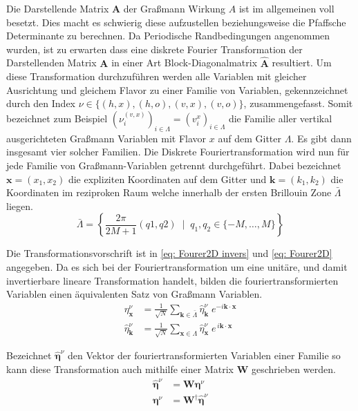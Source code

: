 \noindent Die Darstellende Matrix $\bm A$ der Graßmann Wirkung $A$ ist im allgemeinen voll besetzt. Dies macht es schwierig diese aufzustellen beziehungsweise die Pfaffsche Determinante zu berechnen. Da Periodische Randbedingungen angenommen wurden, ist zu erwarten dass eine diskrete Fourier Transformation der Darstellenden Matrix $\bm A$ in einer Art Block-Diagonalmatrix $\bm{\hat{A}}$ resultiert. Um diese Transformation durchzuführen werden alle Variablen mit gleicher Ausrichtung und gleichem Flavor zu einer Familie von Variablen, gekennzeichnet durch den Index $\nu \in \{(h,x), (h,o), (v,x), (v,o)\}$, zusammengefasst. Somit bezeichnet zum Beispiel $(\nu_i^{(v,x)})_{i \in \Lambda} = (v^x_i)_{i \in \Lambda}$ die Familie aller vertikal ausgerichteten Graßmann Variablen mit Flavor $x$ auf dem Gitter $\Lambda$. Es gibt dann insgesamt vier solcher Familien. Die Diskrete Fouriertransformation wird nun für jede Familie von Graßmann-Variablen getrennt durchgeführt. Dabei bezeichnet $\bm{x} = (x_1, x_2)$ die expliziten Koordinaten auf dem Gitter und $\bm{k} = (k_1,k_2)$ die Koordinaten im reziproken Raum welche innerhalb der ersten Brillouin Zone $\bar{\Lambda}$ liegen. 
\begin{equation}
\bar{\Lambda} = \left\{ \frac{2\pi}{2M+1}(q1, q2) \;\; |\;\; q_1,q_2 \in \{-M,\dots,M\} \right\} 
\end{equation}

\noindent Die Transformationsvorschrift ist in \eqref{eq: Fourer2D invers} und \eqref{eq: Fourer2D} angegeben. Da es sich bei der Fouriertransformation um eine unitäre, und damit invertierbare lineare Transformation handelt, bilden die fouriertransformierten Variablen einen äquivalenten Satz von Graßmann Variablen. 
\begin{align}
\eta_{\bm{x}}^{\nu} &= \frac{1}{\sqrt{N}} \sum_{\bm{k} \in \bar{\Lambda}} \hat{\eta}_{\bm{k}}^{\nu}\; e^{-i \bm{k} \cdot \bm{x}}  \label{eq: Fourer2D invers}\\
\hat{\eta}_{\bm{k}}^{\nu} &= \frac{1}{\sqrt{N}} \sum_{\bm{x} \in \Lambda} \hat{\eta}_{\bm{x}}^{\nu}\; e^{\,i \bm{k} \cdot \bm{x}} \label{eq: Fourer2D}
\end{align}

\noindent Bezeichnet $\bm{\hat{\eta}}^{\nu}$ den Vektor der fouriertransformierten Variablen einer Familie so kann diese Transformation auch mithilfe einer Matrix $\bm{W}$ geschrieben werden.
\begin{align}
\bm{\hat{\eta}}^{\nu} &= \bm{W} \bm{\eta} ^{\nu} \\
\bm{\eta}^{\nu} &= \bm{W}^{\dagger} \bm{\hat{\eta}}^{\nu}
\end{align}


